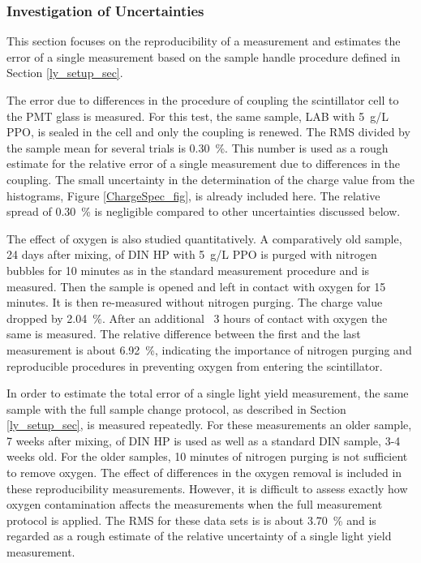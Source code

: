 \documentclass{JINST}
\begin{document}
\subsubsection{Investigation of Uncertainties}
This section focuses on the reproducibility of a measurement and estimates the error of a single measurement based on the sample handle procedure defined in Section \ref{ly_setup_sec}. 

The error due to differences in the procedure of coupling the scintillator cell to the PMT glass is measured. For this test, the same sample, LAB with 5~g/L PPO, is sealed in the cell and only the coupling is renewed. The RMS divided by the sample mean for several trials is 0.30~\%. This number is used as a rough estimate for the relative error of a single measurement due to differences in the coupling. The small uncertainty in the determination of the charge value from the histograms, Figure \ref{ChargeSpec_fig}, is already included here. The relative spread of 0.30~\% is negligible compared to other uncertainties discussed below.   

The effect of oxygen is also studied quantitatively. A comparatively old sample, 24 days after mixing, of DIN HP with 5~g/L PPO is purged with nitrogen bubbles for 10 minutes as in the standard measurement procedure and is measured. Then the sample is opened and left in contact with oxygen for 15 minutes. It is then re-measured without nitrogen purging. The charge value dropped by 2.04~\%. After an additional ~3 hours of contact with oxygen the same is measured. The relative difference between the first and the last measurement is about 6.92~\%, indicating the importance of nitrogen purging and reproducible procedures in preventing oxygen from entering the scintillator. 

In order to estimate the total error of a single light yield measurement, the same sample with the full sample change protocol, as described in Section \ref{ly_setup_sec}, is measured repeatedly. For these measurements an older sample, 7 weeks after mixing, of DIN HP is used as well as a standard DIN sample, 3-4 weeks old. For the older samples, 10 minutes of nitrogen purging is not sufficient to remove oxygen. The effect of differences in the oxygen removal is included in these reproducibility measurements. However, it is difficult to assess exactly how oxygen contamination affects the measurements when the full measurement protocol is applied. The RMS for these data sets 
is is about 3.70~\% and is regarded as a rough estimate of the relative uncertainty of a single light yield measurement.
\end{document}
